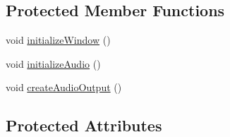 \subsection*{Protected Member Functions}
\begin{DoxyCompactItemize}
\item 
void \hyperlink{class_audio_test_a1b80cfb92faf38273d77a908ad1ef803}{initialize\-Window} ()
\item 
void \hyperlink{class_audio_test_a80b6f4ce52947f96d9f243cf93d04a46}{initialize\-Audio} ()
\item 
void \hyperlink{class_audio_test_a9a38ae87dce3988e4560832475be32ca}{create\-Audio\-Output} ()
\end{DoxyCompactItemize}
\subsection*{Protected Attributes}
